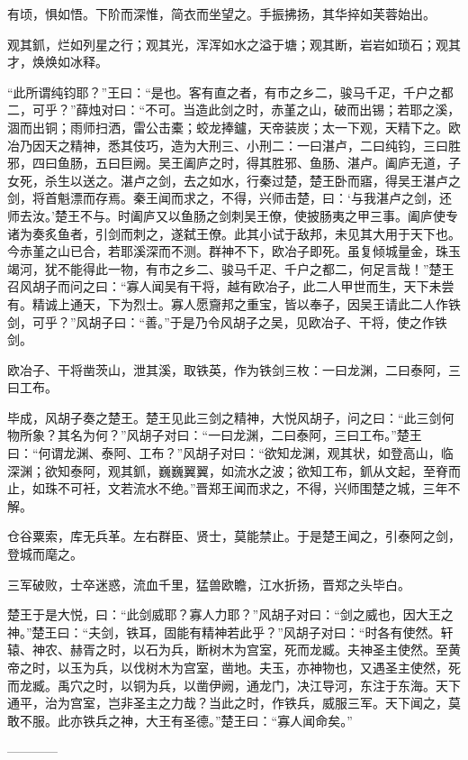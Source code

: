 \documentclass[12pt,UTF8]{ctexbook}
\begin{document}
有顷，惧如悟。下阶而深惟，简衣而坐望之。手振拂扬，其华捽如芙蓉始出。

观其釽，烂如列星之行；观其光，浑浑如水之溢于塘；观其断，岩岩如琐石；观其才，焕焕如冰释。

“此所谓纯钧耶？”王曰：“是也。客有直之者，有市之乡二，骏马千疋，千户之都二，可乎？”薛烛对曰：“不可。当造此剑之时，赤堇之山，破而出锡；若耶之溪，涸而出铜；雨师扫洒，雷公击橐；蛟龙捧鑪，天帝装炭；太一下观，天精下之。欧冶乃因天之精神，悉其伎巧，造为大刑三、小刑二：一曰湛卢，二曰纯钧，三曰胜邪，四曰鱼肠，五曰巨阙。吴王阖庐之时，得其胜邪、鱼肠、湛卢。阖庐无道，子女死，杀生以送之。湛卢之剑，去之如水，行秦过楚，楚王卧而寤，得吴王湛卢之剑，将首魁漂而存焉。秦王闻而求之，不得，兴师击楚，曰：‘与我湛卢之剑，还师去汝。’楚王不与。时阖庐又以鱼肠之剑刺吴王僚，使披肠夷之甲三事。阖庐使专诸为奏炙鱼者，引剑而刺之，遂弑王僚。此其小试于敌邦，未见其大用于天下也。今赤堇之山已合，若耶溪深而不测。群神不下，欧冶子即死。虽复倾城量金，珠玉竭河，犹不能得此一物，有市之乡二、骏马千疋、千户之都二，何足言哉！”楚王召风胡子而问之曰：“寡人闻吴有干将，越有欧冶子，此二人甲世而生，天下未尝有。精诚上通天，下为烈士。寡人愿齎邦之重宝，皆以奉子，因吴王请此二人作铁剑，可乎？”风胡子曰：“善。”于是乃令风胡子之吴，见欧冶子、干将，使之作铁剑。

欧冶子、干将凿茨山，泄其溪，取铁英，作为铁剑三枚：一曰龙渊，二曰泰阿，三曰工布。

毕成，风胡子奏之楚王。楚王见此三剑之精神，大悦风胡子，问之曰：“此三剑何物所象？其名为何？”风胡子对曰：“一曰龙渊，二曰泰阿，三曰工布。”楚王曰：“何谓龙渊、泰阿、工布？”风胡子对曰：“欲知龙渊，观其状，如登高山，临深渊；欲知泰阿，观其釽，巍巍翼翼，如流水之波；欲知工布，釽从文起，至脊而止，如珠不可衽，文若流水不绝。”晋郑王闻而求之，不得，兴师围楚之城，三年不解。

仓谷粟索，库无兵革。左右群臣、贤士，莫能禁止。于是楚王闻之，引泰阿之剑，登城而麾之。

三军破败，士卒迷惑，流血千里，猛兽欧瞻，江水折扬，晋郑之头毕白。

楚王于是大悦，曰：“此剑威耶？寡人力耶？”风胡子对曰：“剑之威也，因大王之神。”楚王曰：“夫剑，铁耳，固能有精神若此乎？”风胡子对曰：“时各有使然。轩辕、神农、赫胥之时，以石为兵，断树木为宫室，死而龙臧。夫神圣主使然。至黄帝之时，以玉为兵，以伐树木为宫室，凿地。夫玉，亦神物也，又遇圣主使然，死而龙臧。禹穴之时，以铜为兵，以凿伊阙，通龙门，决江导河，东注于东海。天下通平，治为宫室，岂非圣主之力哉？当此之时，作铁兵，威服三军。天下闻之，莫敢不服。此亦铁兵之神，大王有圣德。”楚王曰：“寡人闻命矣。”


------------
\end{document}
